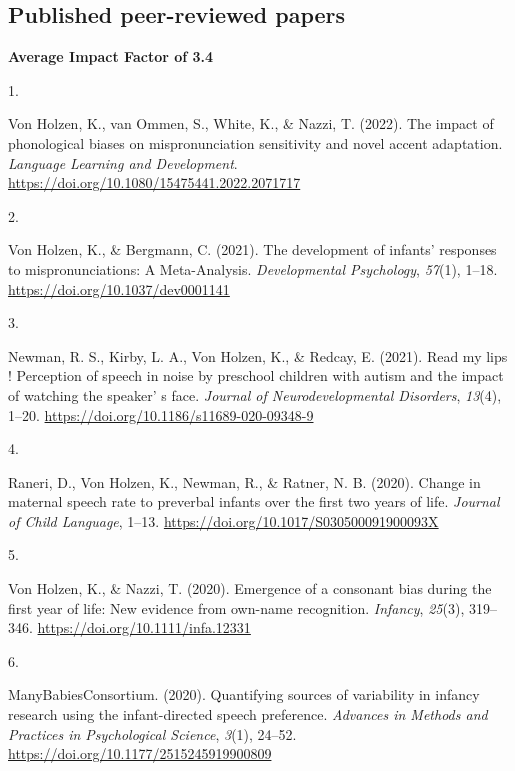 \documentclass[10pt,a4paper,]{article}
\newlength{\cslhangindent}
\newlength{\csllabelwidth}
\newcommand{\CSLLeftMargin}[1]{\parbox[t]{\csllabelwidth}{\hfill #1~}}
\newcommand{\CSLRightInline}[1]{\parbox[t]{\linewidth - \cslhangindent - \csllabelwidth}{#1}\vspace{0.8ex}}
\begin{document}
\hypertarget{published-peer-reviewed-papers}{%
\subsection{Published peer-reviewed
papers}\label{published-peer-reviewed-papers}}

\textbf{Average Impact Factor of 3.4}

\hypertarget{bibliography}{}
\leavevmode{}%
\CSLLeftMargin{1. }%
\CSLRightInline{Von Holzen, K., van Ommen, S., White, K., \& Nazzi, T.
(2022). The impact of phonological biases on mispronunciation
sensitivity and novel accent adaptation. \emph{Language Learning and
Development}. \url{https://doi.org/10.1080/15475441.2022.2071717}}

\leavevmode{}%
\CSLLeftMargin{2. }%
\CSLRightInline{Von Holzen, K., \& Bergmann, C. (2021). The development
of infants' responses to mispronunciations: A Meta-Analysis.
\emph{Developmental Psychology}, \emph{57}(1), 1--18.
\url{https://doi.org/10.1037/dev0001141}}

\leavevmode{}%
\CSLLeftMargin{3. }%
\CSLRightInline{Newman, R. S., Kirby, L. A., Von Holzen, K., \& Redcay,
E. (2021). Read my lips ! Perception of speech in noise by preschool
children with autism and the impact of watching the speaker' s face.
\emph{Journal of Neurodevelopmental Disorders}, \emph{13}(4), 1--20.
\url{https://doi.org/10.1186/s11689-020-09348-9}}

\leavevmode{}%
\CSLLeftMargin{4. }%
\CSLRightInline{Raneri, D., Von Holzen, K., Newman, R., \& Ratner, N. B.
(2020). Change in maternal speech rate to preverbal infants over the
first two years of life. \emph{Journal of Child Language}, 1--13.
\url{https://doi.org/10.1017/S030500091900093X}}

\leavevmode{}%
\CSLLeftMargin{5. }%
\CSLRightInline{Von Holzen, K., \& Nazzi, T. (2020). Emergence of a
consonant bias during the first year of life: New evidence from own-name
recognition. \emph{Infancy}, \emph{25}(3), 319--346.
\url{https://doi.org/10.1111/infa.12331}}

\leavevmode{}%
\CSLLeftMargin{6. }%
\CSLRightInline{ManyBabiesConsortium. (2020). Quantifying sources of
variability in infancy research using the infant-directed speech
preference. \emph{Advances in Methods and Practices in Psychological
Science}, \emph{3}(1), 24--52.
\url{https://doi.org/10.1177/2515245919900809}}
\end{document}

